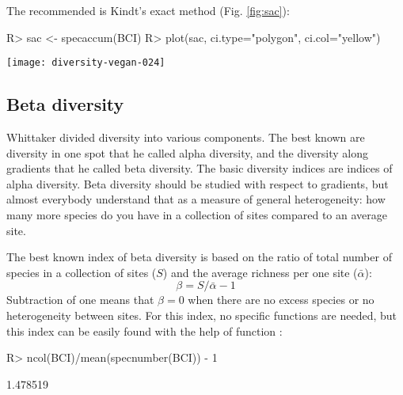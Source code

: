 \documentclass[article,nojss]{jss}
\begin{document}
The recommended is Kindt's exact method (Fig. \ref{fig:sac}):
\begin{Schunk}
\begin{Sinput}
R> sac <- specaccum(BCI)
R> plot(sac, ci.type="polygon", ci.col="yellow")
\end{Sinput}
\end{Schunk}
\begin{SCfigure}
\texttt{[image: diversity-vegan-024]}
\caption{Species accumulation curve for the BCI data; exact method.}
\label{fig:sac}
\end{SCfigure}

\subsection{Beta diversity}

Whittaker divided diversity into various components. The best known
are diversity in one spot that he called alpha diversity, and the
diversity along gradients that he called beta diversity. The basic
diversity indices are indices of alpha diversity. Beta diversity
should be studied with respect to gradients, but almost everybody
understand that as a measure of general heterogeneity: how many more
species do you have in a collection of sites compared to an average
site.

The best known index of beta diversity is based on the ratio of total
number of species in a collection of sites ($S$) and the average
richness per one site ($\bar \alpha$):
\begin{equation}
  \label{eq:beta}
  \beta = S/\bar \alpha - 1
\end{equation}
Subtraction of one means that $\beta = 0$ when there are no excess
species or no heterogeneity between sites. For this index, no specific
functions are needed, but this index can be easily found with the help
of  function :
\begin{Schunk}
\begin{Sinput}
R> ncol(BCI)/mean(specnumber(BCI)) - 1
\end{Sinput}
\begin{Soutput}
[1] 1.478519
\end{Soutput}
\end{Schunk}
\end{document}
